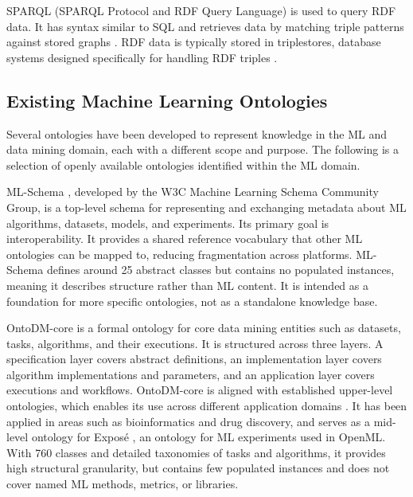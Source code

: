 SPARQL (SPARQL Protocol and RDF Query Language) is used to
query RDF data. It has syntax similar to SQL and retrieves
data by matching triple patterns against stored graphs
\parencite{grobe2009rdf_jena_sparql_semantic_web}.
RDF data is typically stored in triplestores, database systems
designed specifically for handling RDF triples
\parencite{grobe2009rdf_jena_sparql_semantic_web}.

\subsection{Existing Machine Learning Ontologies}

Several ontologies have been developed to represent knowledge
in the ML and data mining domain, each with a different scope
and purpose. The following is a selection of openly available
ontologies identified within the ML domain.


ML-Schema \parencite{publio2018ml_schema_exposing_semantics_machine_learning_schemas_ontologies},
developed by the W3C Machine Learning Schema Community Group,
is a top-level schema for representing and exchanging metadata
about ML algorithms, datasets, models, and experiments.
Its primary goal is interoperability. It provides a shared
reference vocabulary that other ML ontologies can be mapped to,
reducing fragmentation across platforms.
ML-Schema defines around 25 abstract classes but contains no
populated instances, meaning it describes structure rather than
ML content.
It is intended as a foundation for more specific ontologies,
not as a standalone knowledge base.

OntoDM-core \parencite{panov2014ontology_core_data_mining_entities}
is a formal ontology for core data mining entities such as
datasets, tasks, algorithms, and their executions.
It is structured across three layers. A specification layer
covers abstract definitions, an implementation layer covers
algorithm implementations and parameters, and an application
layer covers executions and workflows.
OntoDM-core is aligned with established upper-level ontologies,
which enables its use across different application domains
\parencite{panov2014ontology_core_data_mining_entities}.
It has been applied in areas such as bioinformatics and drug
discovery, and serves as a mid-level ontology for Exposé
\parencite{vanschoren2012experiment_databases}, an ontology
for ML experiments used in OpenML.
With 760 classes and detailed taxonomies of tasks and
algorithms, it provides high structural granularity, but
contains few populated instances and does not cover named ML
methods, metrics, or libraries.

